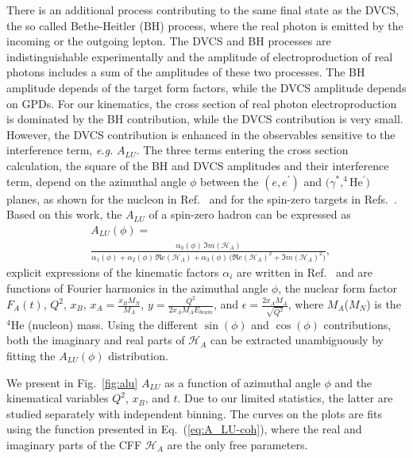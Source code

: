\documentclass[twocolumn,nofootinbib,showpacs,prl,superscriptaddress,secnumarabic,amssymb,nobibnotes,aps,floatfix]{revtex4}
\begin{document}
There is an additional process contributing to the same final state as the 
DVCS, the so called Bethe-Heitler (BH) process, where the real photon is 
emitted by the incoming or the outgoing lepton. The DVCS and BH processes are 
indistinguishable experimentally and the amplitude of electroproduction of real
photons includes a sum of the amplitudes of these two processes. The BH 
amplitude depends of the target form factors, while the DVCS amplitude 
depends on GPDs. For our kinematics, the cross section of real photon 
electroproduction is dominated by the BH contribution, while the DVCS 
contribution is very small. However, the DVCS contribution is
enhanced in the observables sensitive to the interference term, {\it e.g.} 
$A_{LU}$. The three terms entering the cross section calculation,
the square of the BH and DVCS amplitudes and their interference term, depend on the
azimuthal angle $\phi$ between the $(e,e^\prime)$ and $(\gamma^*,^4$He$^\prime)$ planes,
as shown for the nucleon in Ref.~\cite{Belitsky:2001ns} and for the spin-zero targets
in Refs.~\cite{Kirchner:2003wt,Belitsky:2008bz}. Based on this work, the $A_{LU}$ 
of a spin-zero hadron can be expressed as
\begin{equation}
\begin{split}
&A_{LU}(\phi) = \\
&\frac{\alpha_{0}(\phi) \, \Im m(\mathcal{H}_{A})}
{\alpha_{1}(\phi) + \alpha_{2}(\phi) \, \Re e(\mathcal{H}_{A}) + \alpha_{3}(\phi) \, 
\big( \Re e(\mathcal{H}_{A})^{2} + \Im m(\mathcal{H}_{A})^{2} \big)},
\end{split}
\label{eq:A_LU-coh}
\end{equation}
explicit expressions of the kinematic factors $\alpha_i$ are written in
Ref.~\cite{Belitsky:2008bz} and are functions of Fourier harmonics in the 
azimuthal angle $\phi$, the nuclear form factor $F_A(t)$, $Q^2$, $x_B$,
$x_{A} = \frac{x_{B}M_{N}}{M_{A}}$, $y=\frac{Q^{2}}{2x_{A}M_{A}E_{beam}}$, and 
$\epsilon = \frac{2x_{A}M_{A}}{\sqrt{Q^{2}}}$, where $M_{A}$($M_{N}$) is the $^4$He 
(nucleon) mass. Using the different $\sin(\phi)$ and $\cos(\phi)$ contributions, 
both the imaginary and real parts of $\mathcal{H}_{A}$ can be extracted unambiguously
by fitting the $A_{LU}(\phi)$ distribution.

We present in Fig.~\ref{fig:alu} $A_{LU}$ as a function of azimuthal angle 
$\phi$ and the kinematical variables $Q^2$, $x_B$, and $t$. Due to our limited 
statistics, the latter are studied separately with independent binning. The curves on 
the plots are fits using the function presented in Eq.~(\ref{eq:A_LU-coh}), 
where the real and imaginary parts of the CFF $\mathcal{H}_{A}$ are the only 
free parameters. 
\end{document}
